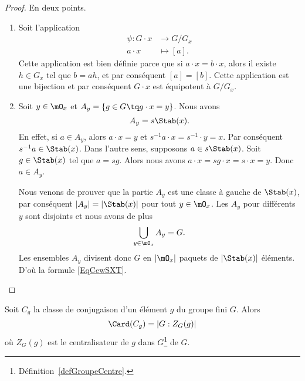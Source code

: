 \begin{proof}
	En deux points.
	\begin{enumerate}
		\item
		      Soit l'application
		      \begin{equation}
			      \begin{aligned}
				      \psi\colon G\cdot x & \to G/G_x    \\
				      a\cdot x            & \mapsto [a].
			      \end{aligned}
		      \end{equation}
		      Cette application est bien définie parce que si \( a\cdot x=b\cdot x\), alors il existe \( h\in G_x\) tel que \( b=ah\), et par conséquent \( [a]=[b]\). Cette application est une bijection et par conséquent \( G\cdot x\) est équipotent à \( G/G_x\).
		\item
		      Soit \( y\in \mO_x\) et \( A_y=\{ g\in G\tq g\cdot x=y \}\). Nous avons
		      \begin{equation}
			      A_y=s\Stab(x).
		      \end{equation}
		      En effet, si \( a\in A_y\), alors \( a\cdot x=y\) et \( s^{-1} a\cdot x=s^{-1}\cdot y=x\). Par conséquent \( s^{-1}a\in\Stab(x)\). Dans l'autre sens, supposons \( a\in s\Stab(x)\). Soit \( g\in\Stab(x)\) tel que \( a=sg\). Alors nous avons \( a\cdot x=sg\cdot x=s\cdot x=y\). Donc \( a\in A_y\).

		      Nous venons de prouver que la partie \( A_y\) est une classe à gauche de \( \Stab(x)\), par conséquent \( | A_y |=|\Stab(x)|\) pour tout \( y\in\mO_x\). Les \( A_y\) pour différents \( y\) sont disjoints et nous avons de plus
		      \begin{equation}
			      \bigcup_{y\in\mO_x}A_y=G.
		      \end{equation}
		      Les ensembles \( A_y\) divisent donc \( G\) en \( | \mO_x |\) paquets de \( | \Stab(x) |\) éléments. D'où la formule \eqref{EqCewSXT}.
	\end{enumerate}
\end{proof}

\begin{corollary}       \label{CORooRRVHooTyCjZZ}
	Soit \( C_g\) la classe de conjugaison d'un élément  \( g\) du groupe fini \( G\). Alors
	\begin{equation}
		\Card(C_g)=| G:Z_G(g) |
	\end{equation}
	où \( Z_G(g)\) est le centralisateur de \( g\) dans \( G\)\footnote{Définition~\ref{defGroupeCentre}.} de \( G\).
\end{corollary}

